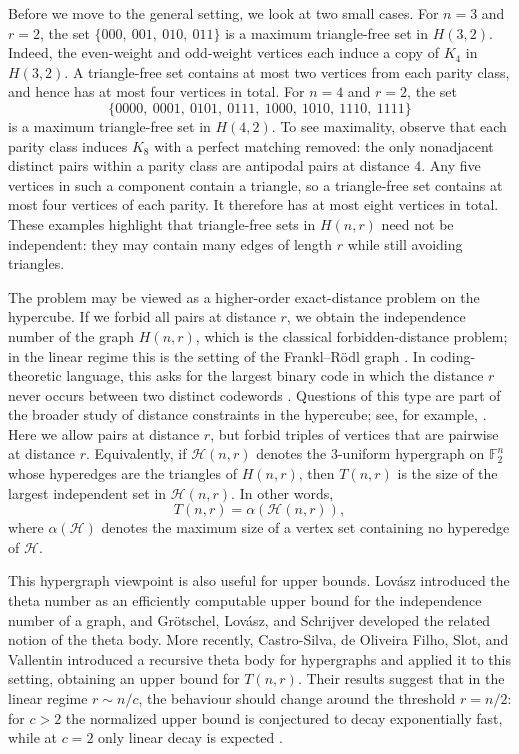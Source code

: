 \documentclass[11pt]{article}
\theoremstyle{plain}
\newcommand{\F}{\mathbb{F}}
\begin{document}
Before we move to the general setting, we look at two small cases.
For $n=3$ and $r=2$, the set $\{{000},\ {001},\ {010},\ {011}\}$
is a maximum triangle-free set in $H(3,2)$. Indeed, the even-weight and odd-weight vertices each induce a copy
of $K_4$ in $H(3,2)$. A triangle-free set contains at most two
vertices from each parity class, and hence has at most four
vertices in total.
For $n=4$ and $r=2$, the set
\[
\{{0000},\ {0001},\ {0101},\ {0111},\ {1000},\ {1010},\ {1110},\ {1111}\}
\]
is a maximum triangle-free set in $H(4,2)$. To see maximality, observe that each parity class induces
$K_8$ with a perfect matching removed: the only nonadjacent
distinct pairs within a parity class are antipodal pairs at
distance $4$. Any five vertices in such a component contain a
triangle, so a triangle-free set contains at most four vertices
of each parity. It therefore has at most eight vertices in total.
These examples highlight that triangle-free sets in $H(n,r)$ need not be independent: they may contain many edges of length $r$ while still avoiding triangles.

The problem may be viewed as a higher-order exact-distance problem on the hypercube.
If we forbid all pairs at distance $r$, we obtain the independence number of the graph $H(n,r)$, which is the classical forbidden-distance problem; in the linear regime this is the setting of the Frankl--R\"odl graph \cite{frankl,kauer}.
In coding-theoretic language, this asks for the largest binary code in which the distance $r$ never occurs between two distinct codewords \cite{enomoto}.
Questions of this type are part of the broader study of distance constraints in the hypercube; see, for example, \cite{kleitman}.
Here we allow pairs at distance $r$, but forbid triples of vertices that are pairwise at distance $r$.
Equivalently, if $\mathcal H(n,r)$ denotes the $3$-uniform hypergraph on $\F_2^n$ whose hyperedges are the triangles of $H(n,r)$, then $T(n,r)$ is the size of the largest independent set in $\mathcal H(n,r)$.
In other words,
\[
T(n,r)=\alpha(\mathcal H(n,r)),
\]
where $\alpha(\mathcal H)$ denotes the maximum size of a vertex set containing no hyperedge of $\mathcal H$.

This hypergraph viewpoint is also useful for upper bounds.
Lov\'asz \cite{lovasz_theta} introduced the theta number as an efficiently computable upper bound for the independence number of a graph, and Gr\"otschel, Lov\'asz, and Schrijver \cite{lovasz} developed the related notion of the theta body.
More recently, Castro-Silva, de Oliveira Filho, Slot, and Vallentin \cite{valentin} introduced a recursive theta body for hypergraphs and applied it to this setting, obtaining an upper bound for $T(n,r)$.
Their results suggest that in the linear regime $r\sim n/c$, the behaviour should change around the threshold $r=n/2$: for $c>2$ the normalized upper bound is conjectured to decay exponentially fast, while at $c=2$ only linear decay is expected \cite[Conjecture~7.3]{valentin}.
\end{document}
